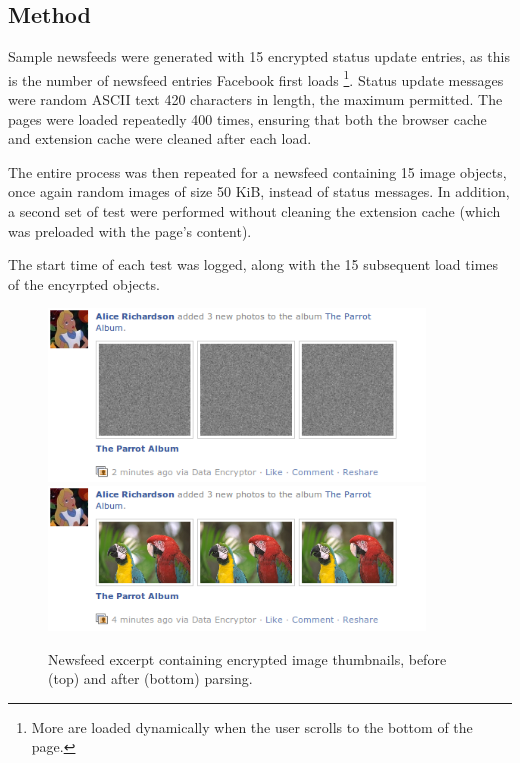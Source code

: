 \subsection{Method}

Sample newsfeeds were generated with 15 encrypted status update entries, as this is the number of newsfeed entries Facebook first loads \footnote{More are loaded dynamically when the user scrolls to the bottom of the page.}. Status update messages were random ASCII text 420 characters in length, the maximum permitted. The pages were loaded repeatedly 400 times, ensuring that both the browser cache and extension cache were cleaned after each load.

The entire process was then repeated for a newsfeed containing 15 image objects, once again random images of size 50 KiB, instead of status messages. In addition, a second set of test were performed without cleaning the extension cache (which was preloaded with the page's content).

The start time of each test was logged, along with the 15 subsequent load times of the encyrpted objects. 

    \begin{figure}[tbph]
        \begin{center}
                \includegraphics[width=10cm]{screens/parrots1.png}
                \includegraphics[width=10cm]{screens/parrots2.png}
            \caption{Newsfeed excerpt containing encrypted image thumbnails, before (top) and after (bottom) parsing.}
            \label{scn:parrots}
        \end{center}
    \end{figure}



